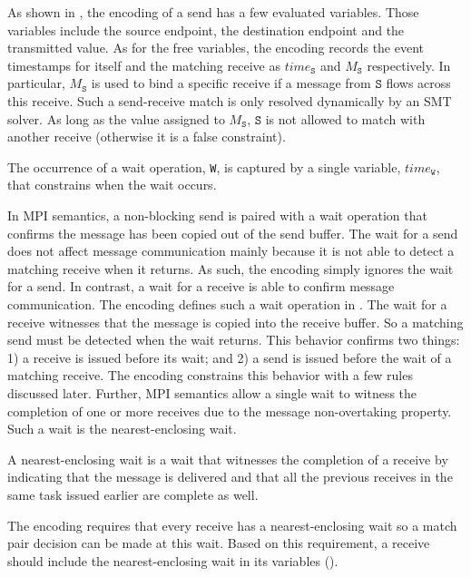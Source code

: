 As shown in , the encoding of a send has a few evaluated variables. Those variables include the source endpoint, the destination endpoint and the transmitted value. As for the free variables, the encoding records the event timestamps for itself and the matching receive as $\mathit{time}_\mathtt{S}$ and $M_\mathtt{S}$ respectively. In particular, $M_\mathtt{S}$ is used to bind a specific receive if a message from $\mathtt{S}$ flows across this receive. Such a send-receive match is only resolved dynamically by an SMT solver. As long as the value assigned to $M_\mathtt{S}$, $\mathtt{S}$ is not allowed to match with another receive (otherwise it is a false constraint).

\begin{definition}[Wait] \label{def:wait}
The occurrence of a wait operation, \texttt{W}, is captured by a
single variable, $\mathit{time}_\mathtt{W}$, that constrains when
the wait occurs.
\end{definition}

In MPI semantics, a non-blocking send is paired with a wait operation that confirms the message has been copied out of the send buffer. The wait for a send does not affect message communication mainly because it is not able to detect a matching receive when it returns. As such, the encoding simply ignores the wait for a send. In contrast,  a wait for a receive is able to confirm message communication. The encoding defines such a wait operation in . The wait for a receive witnesses that the message is copied into the receive buffer. So a matching send must be detected when the wait returns. This behavior confirms two things: 1) a receive is issued before its wait; and 2) a  send is issued before the wait of a matching receive. The encoding constrains this behavior with a few rules discussed later. Further, MPI semantics allow a single wait to witness the completion of one or more receives due to the message non-overtaking property. Such a wait is the nearest-enclosing wait. 

\begin{definition} \label{def:nw}
A nearest-enclosing wait is a wait that witnesses the completion of a receive by indicating that
the message is delivered and that all the previous receives in the
same task issued earlier are complete as well.
\end{definition}

The encoding requires that every receive has a nearest-enclosing wait so a match pair decision can be made at this wait. Based on this requirement, a receive should include the nearest-enclosing wait in its variables ().

